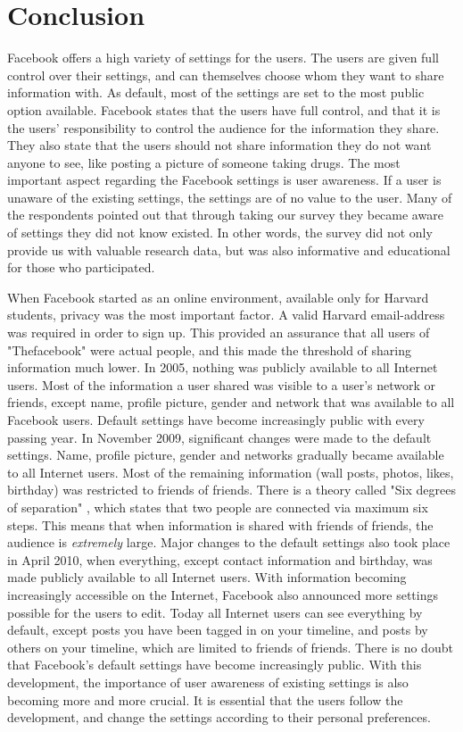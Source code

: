 \chapter{Conclusion}
\label{chp:conclusion} 

Facebook offers a high variety of settings for the users. The users are given full control over their settings, and can themselves choose whom they want to share information with. As default, most of the settings are set to the most public option available. Facebook states that the users have full control, and that it is the users' responsibility to control the audience for the information they share. They also state that the users should not share information they do not want anyone to see, like posting a picture of someone taking drugs. The most important aspect regarding the Facebook settings is user awareness. If a user is unaware of the existing settings, the settings are of no value to the user. Many of the respondents pointed out that through taking our survey they became aware of settings they did not know existed. In other words, the survey did not only provide us with valuable research data, but was also informative and educational for those who participated.  

When Facebook started as an online environment, available only for Harvard students, privacy was the most important factor. A valid Harvard email-address was required in order to sign up. This provided an assurance that all users of "Thefacebook" were actual people, and this made the threshold of sharing information much lower. In 2005, nothing was publicly available to all Internet users. Most of the information a user shared was visible to a user's network or friends, except name, profile picture, gender and network that was available to all Facebook users. Default settings have become increasingly public with every passing year. In November 2009, significant changes were made to the default settings. Name, profile picture, gender and networks gradually became available to all Internet users. Most of the remaining information (wall posts, photos, likes, birthday) was restricted to friends of friends. There is a theory called "Six degrees of separation" \cite{six}, which states that two people are connected via maximum six steps. This means that when information is shared with friends of friends, the audience is \textit{extremely} large. Major changes to the default settings also took place in April 2010, when everything, except contact information and birthday, was made publicly available to all Internet users. With information becoming increasingly accessible on the Internet, Facebook also announced more settings possible for the users to edit. Today all Internet users can see everything by default, except posts you have been tagged in on your timeline, and posts by others on your timeline, which are limited to friends of friends. There is no doubt that Facebook's default settings have become increasingly public. With this development, the importance of user awareness of existing settings is also becoming more and more crucial. It is essential that the users follow the development, and change the settings according to their personal preferences. 

